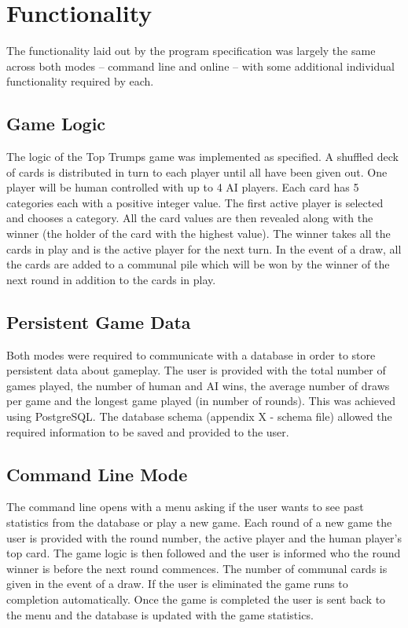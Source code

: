 \newpage
\section{Functionality}
The functionality laid out by the program specification was largely the same across both modes -- command line and online -- with some additional individual functionality required by each.

\subsection{Game Logic}
The logic of the Top Trumps game was implemented as specified. A shuffled deck of cards is distributed in turn to each player until all have been given out. One player will be human controlled with up to 4 AI players. Each card has 5 categories each with a positive integer value. The first active player is selected and chooses a category. All the card values are then revealed along with the winner (the holder of the card with the highest value). The winner takes all the cards in play and is the active player for the next turn. In the event of a draw, all the cards are added to a communal pile which will be won by the winner of the next round in addition to the cards in play.

\subsection{Persistent Game Data}
Both modes were required to communicate with a database in order to store persistent data about gameplay. The user is provided with the total number of games played, the number of human and AI wins, the average number of draws per game and the longest game played (in number of rounds). This was achieved using PostgreSQL. The database schema (appendix X - schema file) allowed the required information to be saved and provided to the user. 

\subsection{Command Line Mode}
The command line opens with a menu asking if the user wants to see past statistics from the database or play a new game. Each round of a new game the user is provided with the round number, the active player and the human player's top card. The game logic is then followed and the user is informed who the round winner is before the next round commences. The number of communal cards is given in the event of a draw. If the user is eliminated the game runs to completion automatically. Once the game is completed the user is sent back to the menu and the database is updated with the game statistics. \\

